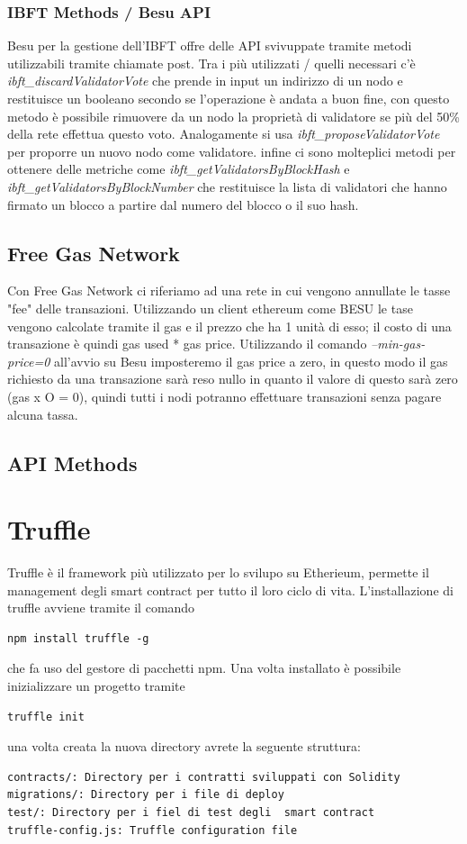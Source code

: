 \documentclass[12pt,titlepage]{report}
\begin{document}
\subsubsection{IBFT Methods / Besu API}
Besu per la gestione dell'IBFT offre delle API svivuppate tramite metodi utilizzabili tramite chiamate post. Tra i più utilizzati / quelli necessari c'è \textit{ibft\_discardValidatorVote} che prende in input un indirizzo di un nodo e restituisce un booleano secondo se l'operazione è andata a buon fine, con questo metodo è possibile rimuovere da un nodo la proprietà di validatore se più del 50\% della rete effettua questo voto. Analogamente si usa \textit{ibft\_proposeValidatorVote} per proporre un nuovo nodo come validatore. infine ci sono molteplici metodi per ottenere delle metriche come \textit{ibft\_getValidatorsByBlockHash} e \textit{ibft\_getValidatorsByBlockNumber} che restituisce la lista di validatori che hanno firmato un blocco a partire dal numero del blocco o il suo hash.

\subsection{Free Gas Network}
Con Free Gas Network ci riferiamo ad una rete in cui vengono annullate le tasse "fee" delle transazioni. Utilizzando un client ethereum come BESU le tase vengono calcolate tramite il gas e il prezzo che ha 1 unità di esso; il costo di una transazione è quindi  gas used * gas price. Utilizzando il comando \textit{--min-gas-price=0} all'avvio su Besu imposteremo il gas price  a zero, in questo modo il gas richiesto da una transazione sarà reso nullo in quanto il valore di questo sarà zero (gas x O = 0), quindi tutti i nodi potranno effettuare transazioni senza pagare alcuna tassa.

\subsection{API Methods}

\section{Truffle}
Truffle è il framework più utilizzato per lo svilupo su Etherieum, permette il management degli smart contract per tutto il loro ciclo di vita. L'installazione di truffle avviene tramite il comando 
\begin{lstlisting}[language=command.com]
npm install truffle -g
\end{lstlisting}
che fa uso del gestore di pacchetti npm.
Una volta installato è possibile inizializzare un progetto tramite 
\begin{lstlisting}
truffle init
\end{lstlisting}
una volta creata la nuova directory avrete la seguente struttura:
\begin{lstlisting}[language=command.com]
contracts/: Directory per i contratti sviluppati con Solidity
migrations/: Directory per i file di deploy
test/: Directory per i fiel di test degli  smart contract
truffle-config.js: Truffle configuration file
\end{lstlisting}
\end{document}
